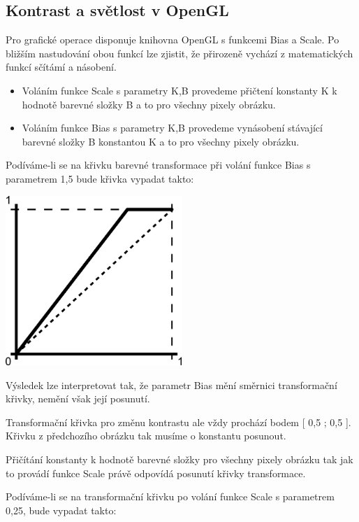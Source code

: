 \newpage
\subsection{Kontrast a světlost v OpenGL}
Pro grafické operace disponuje knihovna OpenGL s funkcemi Bias a Scale. Po bližším nastudování obou funkcí lze zjistit, že přirozeně vychází z matematických funkcí sčítámí a násobení.

\begin{itemize}
\item Voláním funkce Scale s parametry K,B provedeme přičtení konstanty K k hodnotě barevné složky B a to pro všechny pixely obrázku.
\item Voláním funkce Bias s parametry K,B provedeme vynásobení stávající barevné složky B konstantou K a to pro všechny pixely obrázku.
\end{itemize}

Podíváme-li se na křivku barevné transformace při volání funkce Bias s parametrem 1,5 bude křivka vypadat takto:

\begin{center}
\includegraphics[width=0.5\textwidth]{Text/IMG/Bias.png}
\end{center}

Výsledek lze interpretovat tak, že parametr Bias mění směrnici transformační křivky, nemění však její posunutí.

Transformační křivka pro změnu kontrastu ale vždy prochází bodem [ 0,5 ; 0,5 ]. Křivku z předchozího obrázku tak musíme o konstantu posunout.

Přičítání konstanty k hodnotě barevné složky pro všechny pixely obrázku tak jak to provádí funkce Scale právě odpovídá posunutí křivky transformace.

Podíváme-li se na transformační křivku po volání funkce Scale s parametrem 0,25, bude vypadat takto:

